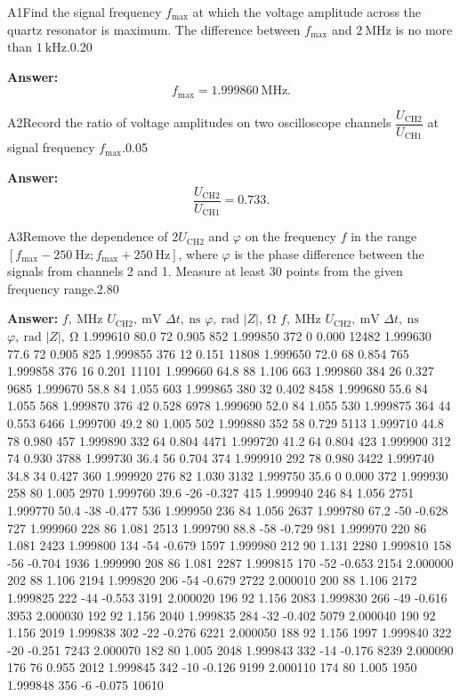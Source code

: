 \documentclass[11pt,a4paper]{article}
\begin{document}
\begin{solcard}{A1}{Find the signal frequency $f_{\max}$ at which the voltage amplitude across the quartz resonator is maximum. The difference between $f_{\max}$ and $2~\mathrm{MHz}$ is no more than $1~\mathrm{kHz}$.}{0.20}
\par\smallskip\noindent\textbf{Answer:} \[f_{\max} = 1.999860 ~\mathrm{MHz}.\]
\end{solcard}

\begin{solcard}{A2}{Record the ratio of voltage amplitudes on two oscilloscope channels $\dfrac{U_{\text{CH}2}}{U_{\text{CH}1}}$ at signal frequency $f_{\max}$.}{0.05}
\par\smallskip\noindent\textbf{Answer:} \[\dfrac{U_{\text{CH}2}}{U_{\text{CH}1}}=0.733.\]
\end{solcard}

\begin{solcard}{A3}{Remove the dependence of $2U_{\text{CH}2}$ and $\varphi$ on the frequency $f$ in the range $[f_{\max}-250~\mathrm{Hz}; f_{\max}+250~\mathrm{Hz}]$, where $\varphi$ is the phase difference between the signals from channels 2 and 1. Measure at least 30 points from the given frequency range.}{2.80}
\par\smallskip\noindent\textbf{Answer:} $f, ~\mathrm{MHz}$ $U_{\text{CH}2},~ \mathrm{mV}$ $\Delta t, ~\mathrm{ns}$ $\varphi, ~ \mathrm{rad}$ $|Z|, ~\mathrm{\Omega}$ $f, ~\mathrm{MHz}$ $U_{\text{CH}2},~ \mathrm{mV}$ $\Delta t, ~\mathrm{ns}$ $\varphi, ~ \mathrm{rad}$ $|Z|, ~\mathrm{\Omega}$ 1.999610 80.0 72 0.905 852 1.999850 372 0 0.000 12482 1.999630 77.6 72 0.905 825 1.999855 376 12 0.151 11808 1.999650 72.0 68 0.854 765 1.999858 376 16 0.201 11101 1.999660 64.8 88 1.106 663 1.999860 384 26 0.327 9685 1.999670 58.8 84 1.055 603 1.999865 380 32 0.402 8458 1.999680 55.6 84 1.055 568 1.999870 376 42 0.528 6978 1.999690 52.0 84 1.055 530 1.999875 364 44 0.553 6466 1.999700 49.2 80 1.005 502 1.999880 352 58 0.729 5113 1.999710 44.8 78 0.980 457 1.999890 332 64 0.804 4471 1.999720 41.2 64 0.804 423 1.999900 312 74 0.930 3788 1.999730 36.4 56 0.704 374 1.999910 292 78 0.980 3422 1.999740 34.8 34 0.427 360 1.999920 276 82 1.030 3132 1.999750 35.6 0 0.000 372 1.999930 258 80 1.005 2970 1.999760 39.6 -26 -0.327 415 1.999940 246 84 1.056 2751 1.999770 50.4 -38 -0.477 536 1.999950 236 84 1.056 2637 1.999780 67.2 -50 -0.628 727 1.999960 228 86 1.081 2513 1.999790 88.8 -58 -0.729 981 1.999970 220 86 1.081 2423 1.999800 134 -54 -0.679 1597 1.999980 212 90 1.131 2280 1.999810 158 -56 -0.704 1936 1.999990 208 86 1.081 2287 1.999815 170 -52 -0.653 2154 2.000000 202 88 1.106 2194 1.999820 206 -54 -0.679 2722 2.000010 200 88 1.106 2172 1.999825 222 -44 -0.553 3191 2.000020 196 92 1.156 2083 1.999830 266 -49 -0.616 3953 2.000030 192 92 1.156 2040 1.999835 284 -32 -0.402 5079 2.000040 190 92 1.156 2019 1.999838 302 -22 -0.276 6221 2.000050 188 92 1.156 1997 1.999840 322 -20 -0.251 7243 2.000070 182 80 1.005 2048 1.999843 332 -14 -0.176 8239 2.000090 176 76 0.955 2012 1.999845 342 -10 -0.126 9199 2.000110 174 80 1.005 1950 1.999848 356 -6 -0.075 10610
\end{solcard}
\end{document}
